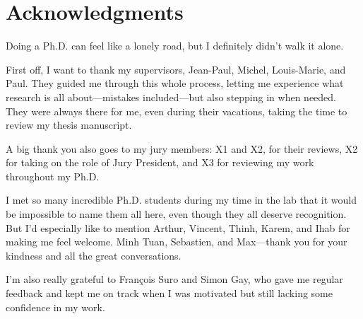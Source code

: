 



\bigskip

\begingroup
\let\clearpage\relax
\let\cleardoublepage\relax
\let\cleardoublepage\relax
\chapter*{Acknowledgments}

Doing a Ph.D. can feel like a lonely road, but I definitely didn’t walk it alone.

First off, I want to thank my supervisors, Jean-Paul, Michel, Louis-Marie, and Paul. They guided me through this whole process, letting me experience what research is all about—mistakes included—but also stepping in when needed. They were always there for me, even during their vacations, taking the time to review my thesis manuscript.

A big thank you also goes to my jury members: X1 and X2, for their reviews, X2 for taking on the role of Jury President, and X3 for reviewing my work throughout my Ph.D.

I met so many incredible Ph.D. students during my time in the lab that it would be impossible to name them all here, even though they all deserve recognition. But I’d especially like to mention Arthur, Vincent, Thinh, Karem, and Ihab for making me feel welcome. Minh Tuan, Sebastien, and Max—thank you for your kindness and all the great conversations.

I’m also really grateful to François Suro and Simon Gay, who gave me regular feedback and kept me on track when I was motivated but still lacking some confidence in my work.

